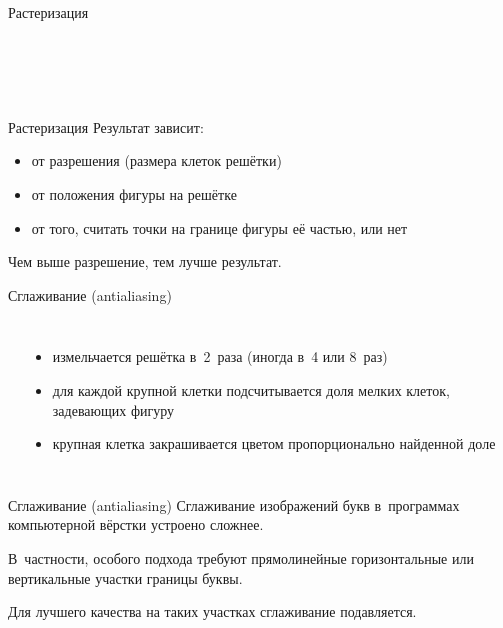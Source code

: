 
\begin{frame}{Растеризация}
\begin{columns}
\\[4ex]
\\[4ex]
\end{columns}
\end{frame}


\begin{frame}{Растеризация}
Результат зависит:
\begin{itemize}
\item от разрешения (размера клеток решётки)
\item от положения фигуры на решётке
\item от того, считать точки на границе фигуры её частью, или нет
\end{itemize}

Чем выше разрешение, тем лучше результат.
\end{frame}


\begin{frame}{Сглаживание (antialiasing)}
\begin{columns}
\\[4ex]
\begin{itemize}
\item
измельчается решётка в~2~раза (иногда в~4 или 8~раз)
\item
для каждой крупной клетки подсчитывается доля мелких клеток, задевающих фигуру
\item
крупная клетка закрашивается цветом пропорционально найденной доле
\end{itemize}
\end{columns}
\end{frame}


\begin{frame}{Сглаживание (antialiasing)}
Сглаживание изображений букв в~программах компьютерной вёрстки устроено
сложнее.

В~частности, особого подхода требуют прямолинейные горизонтальные или
вертикальные участки границы буквы.

Для лучшего качества на таких участках сглаживание подавляется.
\end{frame}

